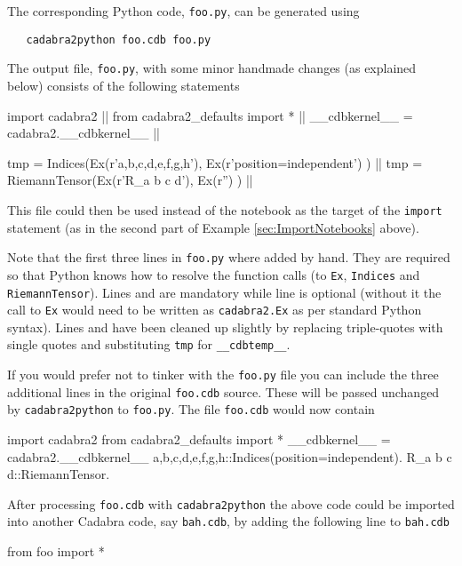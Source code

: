 \documentclass[a4paper,12pt]{article}
\numberwithin{equation}{section}%
\begin{document}
The corresponding Python code, \verb|foo.py|, can be generated using
\bgroup
\lstset{numbers=none}
\begin{lstlisting}
   cadabra2python foo.cdb foo.py
\end{lstlisting}
\egroup
The output file, \verb|foo.py|, with some minor handmade changes (as explained below)
consists of the following statements
\begin{cadabra}
   import cadabra2                                  ||
   from cadabra2_defaults import *                  ||
   __cdbkernel__ = cadabra2.__cdbkernel__           ||

   tmp = Indices(Ex(r'{a,b,c,d,e,f,g,h}'), Ex(r'position=independent') ) ||
   tmp = RiemannTensor(Ex(r'R_{a b c d}'), Ex(r'') )                     ||
\end{cadabra}
This file could then be used instead of the notebook as the target of the \verb|import|
statement (as in the second part of Example \ref{sec:ImportNotebooks} above).

Note that the first three lines in \verb|foo.py| where added by hand. They are required so
that Python knows how to resolve the function calls (to \verb|Ex|, \verb|Indices| and
\verb|RiemannTensor|). Lines  and  are mandatory while line
 is optional (without it the call to \verb|Ex| would need to be written as
\verb|cadabra2.Ex| as per standard Python syntax). Lines  and
 have been cleaned up slightly by replacing triple-quotes with single quotes
and substituting \verb|tmp| for \verb|__cdbtemp__|.

If you would prefer not to tinker with the \verb|foo.py| file you can include
the three additional lines in the original \verb|foo.cdb| source. These will be passed
unchanged by \verb|cadabra2python| to \verb|foo.py|. The file \verb|foo.cdb| would now
contain
\begin{cadabra}
   import cadabra2
   from cadabra2_defaults import *
   __cdbkernel__ = cadabra2.__cdbkernel__
   {a,b,c,d,e,f,g,h}::Indices(position=independent).
   R_{a b c d}::RiemannTensor.
\end{cadabra}
After processing \verb|foo.cdb| with \verb|cadabra2python| the above code could be imported
into another Cadabra code, say \verb|bah.cdb|, by adding the following line to \verb|bah.cdb|
\begin{cadabra}
   from foo import *
\end{cadabra}
\end{document}
